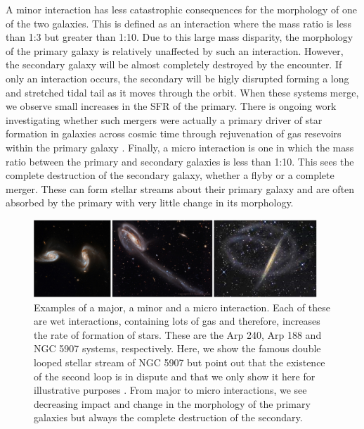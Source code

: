 A minor interaction has less catastrophic consequences for the morphology of one of the two galaxies. This is defined as an interaction where the mass ratio is less than 1:3 but greater than 1:10. Due to this large mass disparity, the morphology of the primary galaxy is relatively unaffected by such an interaction. However, the secondary galaxy will be almost completely destroyed by the encounter. If only an interaction occurs, the secondary will be higly disrupted forming a long and stretched tidal tail as it moves through the orbit. When these systems merge, we observe small increases in the SFR of the primary. There is ongoing work investigating whether such mergers were actually a primary driver of star formation in galaxies across cosmic time through rejuvenation of gas resevoirs within the primary galaxy \citep{2007A&A...476.1179B, 2014MNRAS.440.2944K, 2022MNRAS.511..607J}. Finally, a micro interaction is one in which the mass ratio between the primary and secondary galaxies is less than 1:10. This sees the complete destruction of the secondary galaxy, whether a flyby or a complete merger. These can form stellar streams about their primary galaxy and are often absorbed by the primary with very little change in its morphology.

\begin{figure}
    \centering
    \includegraphics[width=0.95\textwidth]{Introduction/figures/combined-examples-mergers.jpg}
    \caption[Examples of a major, a minor and a micro interaction.]{Examples of a major, a minor and a micro interaction. Each of these are wet interactions, containing lots of gas and therefore, increases the rate of formation of stars. These are the Arp 240, Arp 188 and NGC 5907 systems, respectively. Here, we show the famous double looped stellar stream of NGC 5907 but point out that the existence of the second loop is in dispute and that we only show it here for illustrative purposes \citep{2019ApJ...883L..32V}. From major to micro interactions, we see decreasing impact and change in the morphology of the primary galaxies but always the complete destruction of the secondary.}
    \label{fig:merger-clsfs}
\end{figure}

